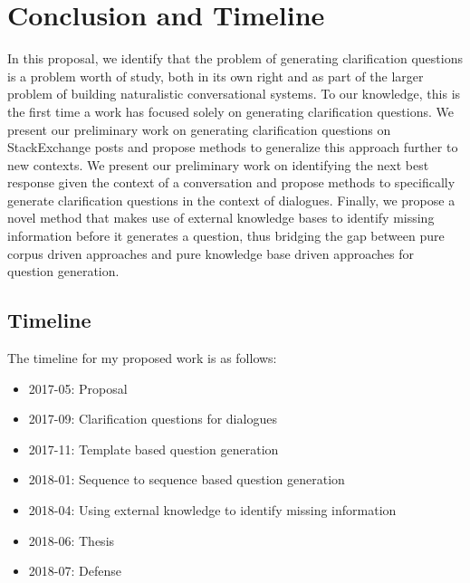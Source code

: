 \documentclass[11pt]{report}
\begin{document}
\newpage

\chapter{Conclusion and Timeline}\label{conclusion}

In this proposal, we identify that the problem of generating clarification questions is a problem worth of study, both in its own right and as part of the larger problem of building naturalistic conversational systems. To our knowledge, this is the first time a work has focused solely on generating clarification questions. We present our preliminary work on generating clarification questions on StackExchange posts and propose methods to generalize this approach further to new contexts. We present our preliminary work on identifying the next best response given the context of a conversation and propose methods to specifically generate clarification questions in the context of dialogues. Finally, we propose a novel method that makes use of external knowledge bases to identify missing information before it generates a question, thus bridging the gap between pure corpus driven approaches and pure knowledge base driven approaches for question generation. 

\section{Timeline}

The timeline for my proposed work is as follows:
\begin{itemize}
\item 2017-05: Proposal
\item 2017-09: Clarification questions for dialogues
\item 2017-11: Template based question generation
\item 2018-01: Sequence to sequence based question generation
\item 2018-04: Using external knowledge to identify missing information
\item 2018-06: Thesis
\item 2018-07: Defense
\end{itemize}

\begin{small}


\end{small}
\end{document}
